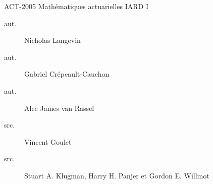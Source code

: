 \begin{contrib}{ACT-2005\: Mathématiques actuarielles IARD I}
\begin{description}
	\item[aut.] Nicholas Langevin
	\item[aut.] Gabriel Crépeault-Cauchon 
	\item[aut.] Alec James van Rassel
	\item[src.] Vincent Goulet
	\item[src.] Stuart A. Klugman, Harry H. Panjer et Gordon E. Willmot
\end{description}
\end{contrib}
